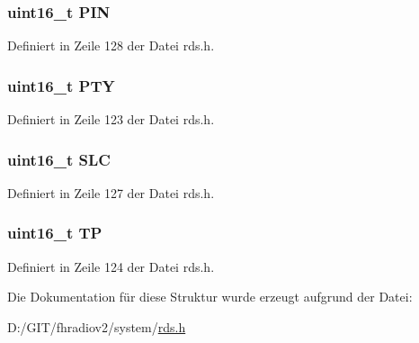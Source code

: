 \subsubsection[{P\+I\+N}]{\setlength{\rightskip}{0pt plus 5cm}uint16\+\_\+t P\+I\+N}\label{structgroup__1a_a23b9db30b873d9b45f435df66328a784}


Definiert in Zeile 128 der Datei rds.\+h.

\hypertarget{structgroup__1a_a0474967478fbbc2c71b800d2e0132d45}{}
\subsubsection[{P\+T\+Y}]{\setlength{\rightskip}{0pt plus 5cm}uint16\+\_\+t P\+T\+Y}\label{structgroup__1a_a0474967478fbbc2c71b800d2e0132d45}


Definiert in Zeile 123 der Datei rds.\+h.

\hypertarget{structgroup__1a_adeb94d897f554bdd08433c17155c53d2}{}
\subsubsection[{S\+L\+C}]{\setlength{\rightskip}{0pt plus 5cm}uint16\+\_\+t S\+L\+C}\label{structgroup__1a_adeb94d897f554bdd08433c17155c53d2}


Definiert in Zeile 127 der Datei rds.\+h.

\hypertarget{structgroup__1a_ab9e634c63b0d95a96716d5f6d7f06d72}{}
\subsubsection[{T\+P}]{\setlength{\rightskip}{0pt plus 5cm}uint16\+\_\+t T\+P}\label{structgroup__1a_ab9e634c63b0d95a96716d5f6d7f06d72}


Definiert in Zeile 124 der Datei rds.\+h.



Die Dokumentation für diese Struktur wurde erzeugt aufgrund der Datei\+:\begin{DoxyCompactItemize}
\item 
D\+:/\+G\+I\+T/fhradiov2/system/\hyperlink{rds_8h}{rds.\+h}\end{DoxyCompactItemize}
